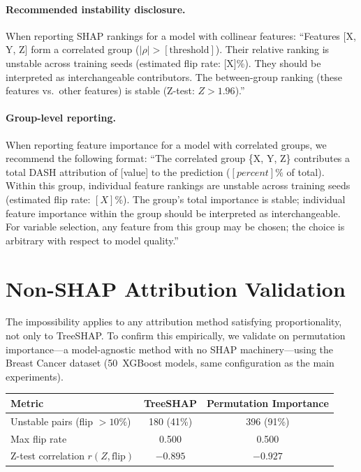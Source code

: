\documentclass{article}
\begin{document}
\paragraph{Recommended instability disclosure.}
When reporting SHAP rankings for a model with collinear features:
``Features [X, Y, Z] form a correlated group ($|\rho| > [\text{threshold}]$).
Their relative ranking is unstable across training seeds
(estimated flip rate: [X]\%).
They should be interpreted as interchangeable contributors.
The between-group ranking (these features vs.\ other features) is stable
(Z-test: $Z > 1.96$).''

\paragraph{Group-level reporting.}
When reporting feature importance for a model with correlated groups,
we recommend the following format:
``The correlated group \{X, Y, Z\} contributes a total DASH attribution
of [value] to the prediction ($[percent]\%$ of total).
Within this group, individual feature rankings are unstable across
training seeds (estimated flip rate: $[X]\%$).
The group's total importance is stable; individual feature importance
within the group should be interpreted as interchangeable.
For variable selection, any feature from this group may be chosen;
the choice is arbitrary with respect to model quality.''

\section{Non-SHAP Attribution Validation}
\label{sec:non-shap-validation}

The impossibility applies to any attribution method satisfying
proportionality, not only to TreeSHAP. To confirm this empirically,
we validate on permutation importance---a model-agnostic method with
no SHAP machinery---using the Breast Cancer dataset (50~XGBoost
models, same configuration as the main experiments).

\begin{center}
\small
\begin{tabular}{@{}lcc@{}}
\toprule
Metric & TreeSHAP & Permutation Importance \\
\midrule
Unstable pairs (flip $>10\%$) & 180 (41\%) & 396 (91\%) \\
Max flip rate & 0.500 & 0.500 \\
Z-test correlation $r(Z, \text{flip})$ & $-0.895$ & $-0.927$ \\
\bottomrule
\end{tabular}
\end{center}
\end{document}

